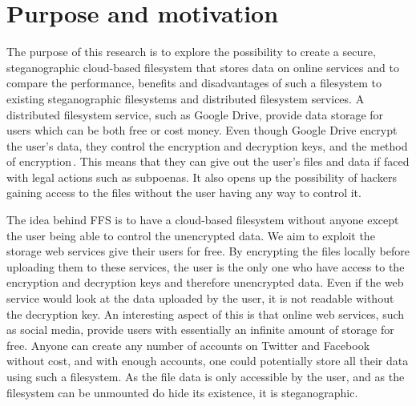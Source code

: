 
\section{Purpose and motivation}

The purpose of this research is to explore the possibility to create a secure, steganographic cloud-based filesystem that stores data on online services and to compare the performance, benefits and disadvantages of such a filesystem to existing steganographic filesystems and distributed filesystem services. A distributed filesystem service, such as Google Drive, provide data storage for users which can be both free or cost money. Even though Google Drive encrypt the user's data, they control the encryption and decryption keys, and the method of encryption\,\cite{johnsonGoogleDriveSecure2021}. This means that they can give out the user's files and data if faced with legal actions such as subpoenas. It also opens up the possibility of hackers gaining access to the files without the user having any way to control it.

The idea behind FFS is to have a cloud-based filesystem without anyone except the user being able to control the unencrypted data. We aim to exploit the storage web services give their users for free. By encrypting the files locally before uploading them to these services, the user is the only one who have access to the encryption and decryption keys and therefore unencrypted data. Even if the web service would look at the data uploaded by the user, it is not readable without the decryption key. An interesting aspect of this is that online web services, such as social media, provide users with essentially an infinite amount of storage for free. Anyone can create any number of accounts on Twitter and Facebook without cost, and with enough accounts, one could potentially store all their data using such a filesystem. As the file data is only accessible by the user, and as the filesystem can be unmounted do hide its existence, it is steganographic. 

